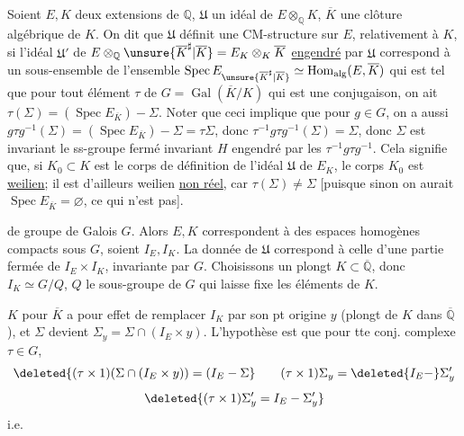 Soient $E,K$ deux extensions de $\mathbb Q$, \deleted{$\Sigma$}
$\mathfrak U$ un idéal de  $E\otimes_{\mathbb Q}K$,
$\overline K$ une clôture algébrique de $K$.
On dit que $\mathfrak U$ définit une CM-structure sur $E$, relativement à $K$,
si l'idéal $\mathfrak U'$ de
$E\otimes_{\mathbb Q}\unsure{\overline K^{\sharp}|\overline K}=E_K\otimes_K\overline K$
\uline{engendré} par $\mathfrak U$ correspond à un sous-ensemble \inserted{$\Sigma$}
de l'ensemble  
$\operatorname{Spec}E_{\unsure{\overline K^{\sharp}|\overline K}}
\simeq\operatorname{Hom}_{\mathrm{alg}}(E,\overline K)$ qui est tel que pour tout
élément $\tau$ de $G=\operatorname{Gal}(\overline K/K)$ qui est une conjugaison,
on ait $\tau(\Sigma)=(\operatorname{Spec}E_{\overline K})-\Sigma$.
Noter que ceci implique que pour $g\in G$, on a aussi
$g\tau g^{-1}(\Sigma)=(\operatorname{Spec}E_{\overline K})-\Sigma=\tau\Sigma$,
donc $\tau^{-1}g\tau g^{-1}(\Sigma)=\Sigma$, donc $\Sigma$ est invariant
  le ss-groupe  fermé invariant $H$
engendré par les $\tau^{-1}g\tau g^{-1}$.
Cela signifie que, si $K_0\subset K$ est le corps de définition de l'idéal
$\mathfrak U$ de $E_K$, le corps $K_0$  est \uline{weilien};
 il est d'ailleurs weilien \uline{non réel}, car $\tau(\Sigma)\ne\Sigma$
[puisque sinon on aurait $\operatorname{Spec}E_{\overline K}=\varnothing$, ce qui n'est pas].

 de groupe de Galois $G$.
Alors $E,K$ correspondent à des espaces homogènes compacts sous $G$, soient $I_E,I_K$.
La donnée de $\mathfrak U$ correspond à celle d'une partie fermée de $I_E\times I_K$,
invariante par $G$. Choisissons un plongt $K\subset\overline{\mathbb Q}$,
donc $I_K\simeq G/Q$, $Q$ le sous-groupe de $G$ qui laisse fixe les éléments de $K$.

   $K$ pour $\overline K$ a pour effet de remplacer
$I_K$ par son pt origine $y$  (plongt de $K$ dans $\overline{\mathbb Q}$),
et $\Sigma$ devient $\Sigma_y=\Sigma\cap(I_E\times y)$.
L'hypothèse est que pour tte conj. complexe $\tau\in G$,
\[
\deleted{(\tau\times1)(\Sigma\cap(I_E\times y))=(I_E-\Sigma}
\qquad
(\tau\times1)\Sigma_y=\deleted{I_E-}\Sigma'_y
\]
\[
\deleted{(\tau\times1)\Sigma'_y=I_E-\Sigma'_y}
\]
i.e.
\par\noindent
{}
\par
{}
